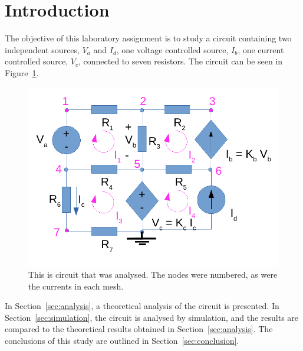 \section{Introduction}
\label{sec:introduction}

The objective of this laboratory assignment is to study a circuit containing two independent sources, $V_a$ and $I_d$, one voltage controlled source, $I_b$, one current controlled source, $V_c$, connected to seven resistors. The circuit can be seen in Figure~\ref{fig1}.

\begin{figure}[h] \centering
\includegraphics[width=0.4\linewidth]{t1-1.pdf}
\caption{This is circuit that was analysed. The nodes were numbered, as were the currents in each mesh.}
\label{fig1}
\end{figure}

In Section~\ref{sec:analysis}, a theoretical analysis of the circuit is
presented. In Section~\ref{sec:simulation}, the circuit is analysed by
simulation, and the results are compared to the theoretical results obtained in
Section~\ref{sec:analysis}. The conclusions of this study are outlined in
Section~\ref{sec:conclusion}.
